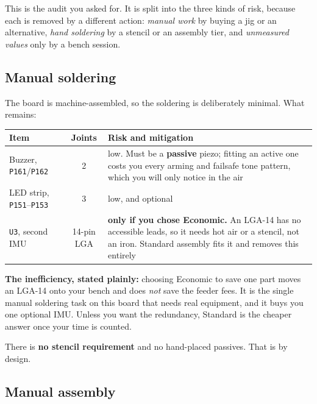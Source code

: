 \documentclass[11pt,a4paper]{article}
\newcommand{\file}[1]{\texttt{\small #1}}
\newcommand{\flag}[1]{\textcolor{warnred}{\textbf{#1}}}
\begin{document}
This is the audit you asked for. It is split into the three kinds of risk, because each is
removed by a different action: \emph{manual work} by buying a jig or an alternative,
\emph{hand soldering} by a stencil or an assembly tier, and \emph{unmeasured values} only by
a bench session.

\subsection{Manual soldering}

The board is machine-assembled, so the soldering is deliberately minimal. What remains:

\begin{center}
\begin{tabular}{@{}p{}cp{}@{}}
\toprule
\textbf{Item} & \textbf{Joints} & \textbf{Risk and mitigation} \\
\midrule
Buzzer, \file{P161}/\file{P162} & 2 & low. Must be a \textbf{passive} piezo; fitting an active
one costs you every arming and failsafe tone pattern, which you will only notice in the air \\
LED strip, \file{P151}--\file{P153} & 3 & low, and optional \\
\file{U3}, second IMU & 14-pin LGA & \flag{only if you chose Economic.} An LGA-14 has no
accessible leads, so it needs hot air or a stencil, not an iron. Standard assembly fits it
and removes this entirely \\
\bottomrule
\end{tabular}
\end{center}

\textbf{The inefficiency, stated plainly:} choosing Economic to save one part moves an
LGA-14 onto your bench and does \emph{not} save the feeder fees. It is the single manual
soldering task on this board that needs real equipment, and it buys you one optional IMU.
Unless you want the redundancy, Standard is the cheaper answer once your time is counted.

There is \textbf{no stencil requirement} and no hand-placed passives. That is by design.

\subsection{Manual assembly}
\end{document}
